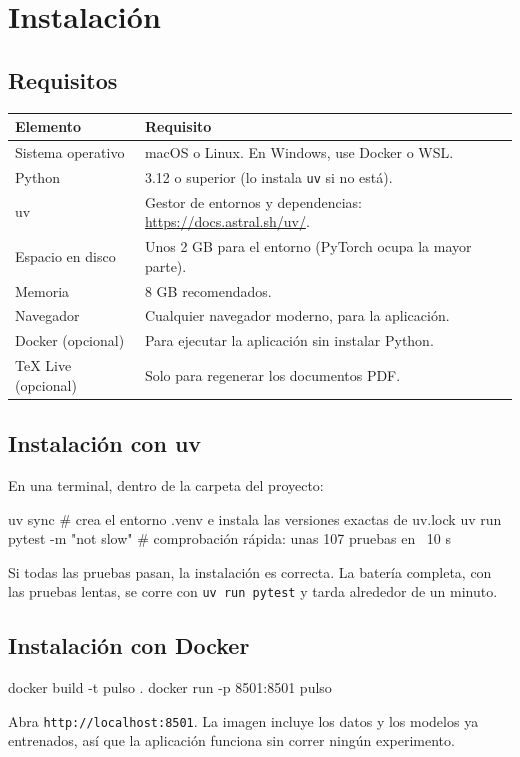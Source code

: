 \chapter{Instalación}

\section{Requisitos}
\begin{center}
\begin{tabular}{p{}p{}}
\toprule
\textbf{Elemento} & \textbf{Requisito} \\
\midrule
Sistema operativo & macOS o Linux. En Windows, use Docker o WSL. \\
Python & 3.12 o superior (lo instala \texttt{uv} si no está). \\
uv & Gestor de entornos y dependencias: \url{https://docs.astral.sh/uv/}. \\
Espacio en disco & Unos 2 GB para el entorno (PyTorch ocupa la mayor parte). \\
Memoria & 8 GB recomendados. \\
Navegador & Cualquier navegador moderno, para la aplicación. \\
Docker (opcional) & Para ejecutar la aplicación sin instalar Python. \\
TeX Live (opcional) & Solo para regenerar los documentos PDF. \\
\bottomrule
\end{tabular}
\end{center}

\section{Instalación con uv}
En una terminal, dentro de la carpeta del proyecto:
\begin{terminal}
uv sync                       # crea el entorno .venv e instala las versiones exactas de uv.lock
uv run pytest -m "not slow"   # comprobación rápida: unas 107 pruebas en ~10 s
\end{terminal}
Si todas las pruebas pasan, la instalación es correcta. La batería completa, con las
pruebas lentas, se corre con \texttt{uv run pytest} y tarda alrededor de un minuto.

\section{Instalación con Docker}
\begin{terminal}
docker build -t pulso .
docker run -p 8501:8501 pulso
\end{terminal}
Abra \texttt{http://localhost:8501}. La imagen incluye los datos y los modelos ya
entrenados, así que la aplicación funciona sin correr ningún experimento.

